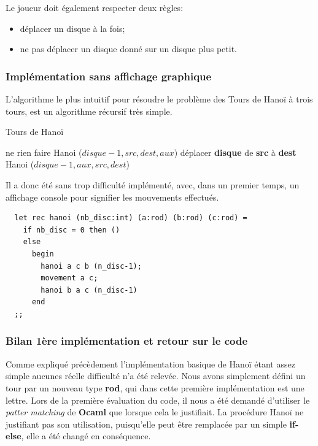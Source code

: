 \documentclass[a4paper,11pt]{article}
\begin{document}
Le joueur doit également respecter deux règles:
\begin{itemize}
\item déplacer un disque à la fois;
\item ne pas déplacer un disque donné sur un disque plus petit.
\end{itemize}

\subsubsection{Implémentation sans affichage graphique}
\label{sec:algoBase}
L'algorithme le plus intuitif pour résoudre le problème des Tours de Hanoï à trois tours,
est un algorithme récursif très simple.

\begin{algorithm}
  \caption{Tours de Hanoï}\label{algo:hanoi1}
  \begin{algorithmic}[1]
     
    ne rien faire
    \Else
    \State Hanoi ($disque - 1, src, dest, aux$)
    \State déplacer \textbf{disque} de \textbf{src} à \textbf{dest}
    \State Hanoi ($disque - 1, aux, src, dest$)
    \EndIf
    \EndProcedure
\end{algorithmic}
\end{algorithm}
Il a donc été sans trop difficulté implémenté, avec, dans un premier temps,  un affichage console pour signifier les mouvements effectués.
\begin{lstlisting}
  let rec hanoi (nb_disc:int) (a:rod) (b:rod) (c:rod) =
    if nb_disc = 0 then ()
    else
      begin
        hanoi a c b (n_disc-1);
        movement a c;
        hanoi b a c (n_disc-1)
      end
  ;;
\end{lstlisting}

\subsubsection*{Bilan 1ère implémentation et retour sur le code}%
Comme expliqué précèdement l'implémentation basique de Hanoï étant assez simple aucunes réelle difficulté n'a été relevée.
Nous avons simplement défini un tour par un nouveau type \textbf{rod}, qui dans cette première implémentation est une lettre.
Lors de la première évaluation du code, il nous a été demandé d'utiliser le \emph{patter matching} de \textbf{Ocaml} que lorsque
cela le justifiait.
La procédure Hanoï ne justifiant pas son utilisation, puisqu'elle peut être remplacée par un simple \textbf{if-else},
elle a été changé en conséquence.
\end{document}
